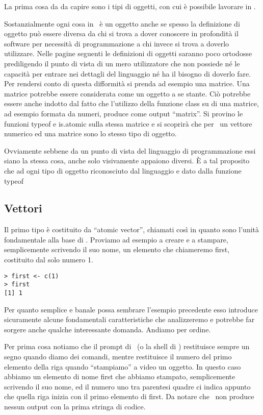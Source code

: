 La prima cosa da da capire sono i tipi di oggetti, con cui è possibile lavorare in \erre.

Sostanzialmente ogni cosa in \erre\ è un oggetto anche se spesso la definizione di oggetto può essere diversa da chi si trova a dover conoscere in profondità il software per necessità di programmazione a chi invece si trova a doverlo utilizzare. Nelle pagine seguenti le definizioni di oggetti saranno poco ortodosse prediligendo il punto di vista di un mero utilizzatore che non possiede né le capacità per entrare nei dettagli del linguaggio né ha il bisogno di doverlo fare. Per rendersi conto di questa difformità si prenda ad esempio una matrice. Una matrice potrebbe essere considerata come un oggetto a se stante. Ciò potrebbe essere anche indotto dal fatto che l'utilizzo della funzione class su di una matrice, ad esempio formata da numeri, produce come output “matrix”. Si provino le funzioni typeof e is.atomic sulla stessa matrice e si scoprirà che per \erre\ un vettore numerico ed una matrice sono lo stesso tipo di oggetto.

Ovviamente sebbene da un punto di vista del linguaggio di programmazione essi siano la stessa cosa, anche solo visivamente appaiono diversi. È a tal proposito che ad ogni tipo di oggetto riconosciuto dal linguaggio e dato dalla funzione typeof 
 
\subsection{Vettori}
Il primo tipo è costituito da ``atomic vector'', chiamati così in quanto sono l'unità fondamentale alla base di \erre.
Proviamo ad esempio a creare e a stampare, semplicemente scrivendo il suo nome, un elemento che chiameremo first, costituito dal solo numero 1.

\begin{lstlisting}
> first <- c(1)
> first
[1] 1
\end{lstlisting}

Per quanto semplice e banale possa sembrare l'esempio precedente esso introduce sicuramente alcune fondamentali caratteristiche che analizzeremo e potrebbe far sorgere anche qualche interessante domanda. Andiamo per ordine.

Per prima cosa notiamo che il prompt di \erre\ (o la shell di \erre) restituisce sempre un segno \cod{>} quando diamo dei comandi, mentre restituisce il numero del primo elemento della riga quando ``stampiamo'' a video un oggetto. In questo caso abbiamo un elemento di nome first che abbiamo stampato, semplicemente scrivendo il suo nome, ed il numero uno tra parentesi quadre ci indica appunto che quella riga inizia con il primo elemento di first. Da notare che \erre\ non produce nessun output con la prima stringa di codice.

